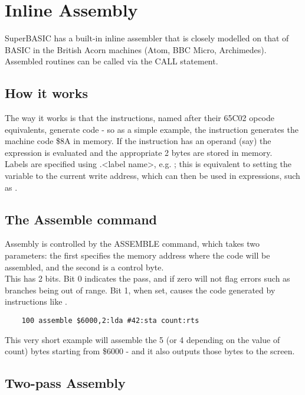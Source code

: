 \chapter{Inline Assembly}
\label{chap:assembly}

SuperBASIC has a built-in inline assembler that is closely modelled on that of BASIC in the British Acorn machines (Atom, BBC Micro, Archimedes). Assembled routines can be called via the CALL statement.\\

\section{How it works}

The way it works is that the instructions, named after their 65C02 opcode equivalents, generate code - so as a simple example, the instruction  generates the machine code \$8A in memory. If the instruction has an operand (say)  the expression is evaluated and the appropriate 2 bytes are stored in memory. \\

Labels are specified using .<label name>, e.g. ; this is equivalent to setting the variable  to the current write address, which can then be used in expressions, such as .

\section {The Assemble command}

Assembly is controlled by the ASSEMBLE command, which takes two parameters: the first specifies the memory address where the code will be assembled, and the second is a control byte.\\

This has 2 bits.  Bit 0 indicates the pass, and if zero will not flag errors such as branches being out of range. Bit 1, when set, causes the code generated by instructions like .

\begin{verbatim}
	100 assemble $6000,2:lda #42:sta count:rts
\end{verbatim}

This very short example will assemble the 5 (or 4 depending on the value of count) bytes starting from \$6000 - and it also outputs those bytes to the screen. \\

\section {Two-pass Assembly}

